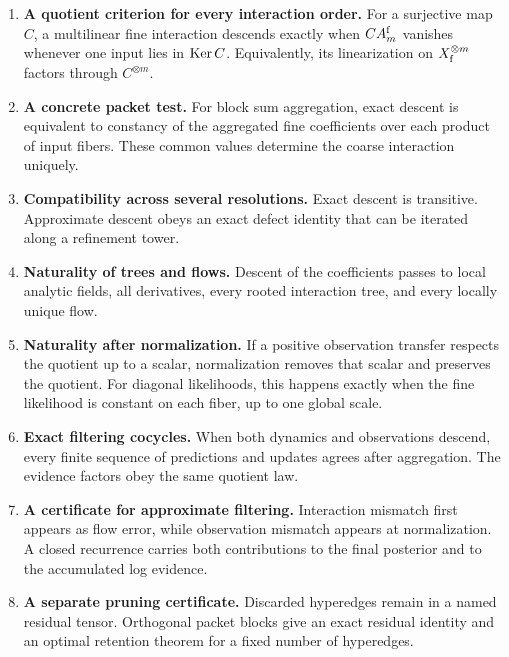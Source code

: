 \begin{enumerate}[label=\textbf{C\arabic*.},leftmargin=3.5em]
\item \textbf{A quotient criterion for every interaction order.}
For a surjective map $C$, a multilinear fine interaction descends exactly when $CA_m^{\mathrm f}$ vanishes whenever one input lies in $\operatorname{Ker} C$.  Equivalently, its linearization on $X_{\mathrm f}^{\otimes m}$ factors through $C^{\otimes m}$.

\item \textbf{A concrete packet test.}
For block sum aggregation, exact descent is equivalent to constancy of the aggregated fine coefficients over each product of input fibers.  These common values determine the coarse interaction uniquely.

\item \textbf{Compatibility across several resolutions.}
Exact descent is transitive.  Approximate descent obeys an exact defect identity that can be iterated along a refinement tower.

\item \textbf{Naturality of trees and flows.}
Descent of the coefficients passes to local analytic fields, all derivatives, every rooted interaction tree, and every locally unique flow.

\item \textbf{Naturality after normalization.}
If a positive observation transfer respects the quotient up to a scalar, normalization removes that scalar and preserves the quotient.  For diagonal likelihoods, this happens exactly when the fine likelihood is constant on each fiber, up to one global scale.

\item \textbf{Exact filtering cocycles.}
When both dynamics and observations descend, every finite sequence of predictions and updates agrees after aggregation.  The evidence factors obey the same quotient law.

\item \textbf{A certificate for approximate filtering.}
Interaction mismatch first appears as flow error, while observation mismatch appears at normalization.  A closed recurrence carries both contributions to the final posterior and to the accumulated log evidence.

\item \textbf{A separate pruning certificate.}
Discarded hyperedges remain in a named residual tensor.  Orthogonal packet blocks give an exact residual identity and an optimal retention theorem for a fixed number of hyperedges.
\end{enumerate}


